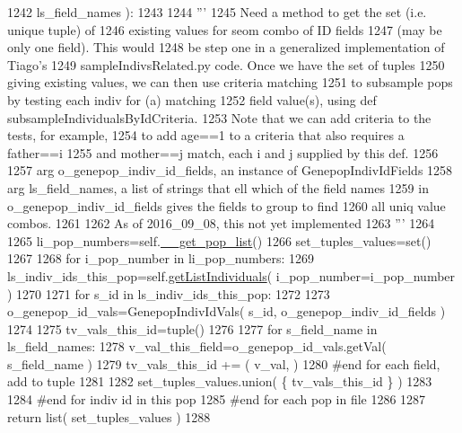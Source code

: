 \begin{DoxyCode}
1242                             ls\_field\_names ):
1243 
1244         \textcolor{stringliteral}{'''}
1245 \textcolor{stringliteral}{        Need a method to get the set (i.e. unique tuple) of }
1246 \textcolor{stringliteral}{        existing values for seom combo of ID fields }
1247 \textcolor{stringliteral}{        (may be only one field).  This would }
1248 \textcolor{stringliteral}{        be step one in a generalized implementation of Tiago's }
1249 \textcolor{stringliteral}{        sampleIndivsRelated.py code. Once we have the set of tuples }
1250 \textcolor{stringliteral}{        giving existing values, we can then use criteria matching }
1251 \textcolor{stringliteral}{        to subsample pops by testing each indiv for (a) matching }
1252 \textcolor{stringliteral}{        field value(s), using def subsampleIndividualsByIdCriteria.  }
1253 \textcolor{stringliteral}{        Note that we can add criteria to the tests, for example, }
1254 \textcolor{stringliteral}{        to add age==1 to a criteria that also requires a father==i }
1255 \textcolor{stringliteral}{        and mother==j match, each i and j supplied by this def.}
1256 \textcolor{stringliteral}{}
1257 \textcolor{stringliteral}{        arg o\_genepop\_indiv\_id\_fields, an instance of GenepopIndivIdFields}
1258 \textcolor{stringliteral}{        arg ls\_field\_names, a list of strings that ell which of the field names}
1259 \textcolor{stringliteral}{                in o\_genepop\_indiv\_id\_fields gives the fields to group to find}
1260 \textcolor{stringliteral}{                all uniq value combos.}
1261 \textcolor{stringliteral}{}
1262 \textcolor{stringliteral}{        As of 2016\_09\_08, this not yet implemented}
1263 \textcolor{stringliteral}{        '''}
1264 
1265         li\_pop\_numbers=self.\hyperlink{classnegui_1_1genepopfilemanager_1_1GenepopFileManager_a0cd3178624c652968b4d319f12e5df6e}{\_\_get\_pop\_list}() 
1266         set\_tuples\_values=set()
1267 
1268         \textcolor{keywordflow}{for} i\_pop\_number \textcolor{keywordflow}{in} li\_pop\_numbers:
1269             ls\_indiv\_ids\_this\_pop=self.\hyperlink{classnegui_1_1genepopfilemanager_1_1GenepopFileManager_aa6993dde24163002aeae55005437711d}{getListIndividuals}( i\_pop\_number=i\_pop\_number )
1270 
1271             \textcolor{keywordflow}{for} s\_id \textcolor{keywordflow}{in} ls\_indiv\_ids\_this\_pop:
1272 
1273                 o\_genepop\_id\_vals=GenepopIndivIdVals( s\_id, o\_genepop\_indiv\_id\_fields )
1274 
1275                 tv\_vals\_this\_id=tuple() 
1276 
1277                 \textcolor{keywordflow}{for} s\_field\_name \textcolor{keywordflow}{in} ls\_field\_names:
1278                     v\_val\_this\_field=o\_genepop\_id\_vals.getVal( s\_field\_name )
1279                     tv\_vals\_this\_id += ( v\_val, )
1280                 \textcolor{comment}{#end for each field, add to tuple}
1281 
1282                 set\_tuples\_values.union( \{ tv\_vals\_this\_id \} )
1283 
1284             \textcolor{comment}{#end for indiv id in this pop}
1285         \textcolor{comment}{#end for each pop in file}
1286 
1287         \textcolor{keywordflow}{return} list( set\_tuples\_values )
1288 
\end{DoxyCode}
